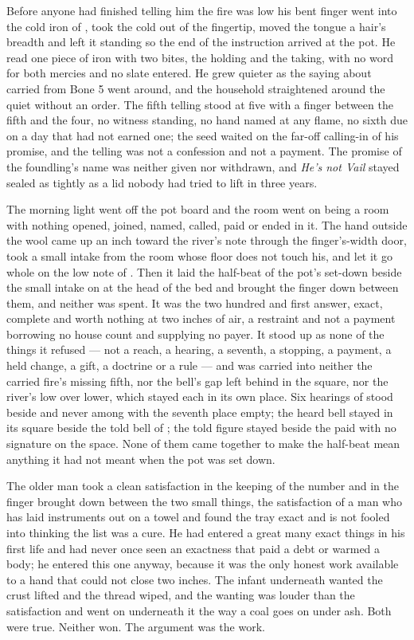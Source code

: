 Before anyone had finished telling him the fire was low his bent finger went into the cold iron of , took the cold out of the fingertip, moved the tongue a hair's breadth and left it standing so the end of the instruction arrived at the pot. He read one piece of iron with two bites, the holding and the taking, with no  word for both mercies and no slate entered. He grew quieter as the saying about  carried from Bone 5 went around, and the household straightened around the quiet without an order. The fifth telling stood at five with a finger between the fifth and the four, no witness standing, no hand named at any flame, no sixth due on a day that had not earned one; the seed waited on the far-off calling-in of his promise, and the telling was not a confession and not a payment. The promise of the foundling's name was neither given nor withdrawn, and \emph{He's not Vail} stayed sealed as tightly as a lid nobody had tried to lift in three years.

\scenebreak

The morning light went off the pot board and the room went on being a room with nothing opened, joined, named, called, paid or ended in it. The hand outside the wool came up an inch toward the river's note through the finger's-width door, took a small intake from the room whose floor does not touch his, and let it go whole on the low note of . Then it laid the half-beat of the pot's set-down beside the small intake on  at the head of the bed and brought the finger down between them, and neither was spent. It was the two hundred and first answer, exact, complete and worth nothing at two inches of air, a restraint and not a payment borrowing no house count and supplying no payer. It stood up as none of the things it refused --- not a reach, a hearing, a seventh, a stopping, a payment, a held change, a gift, a doctrine or a rule --- and was carried into neither the carried fire's missing fifth, nor the bell's gap left behind in the square, nor the river's low over lower, which stayed each in its own place. Six hearings of  stood beside and never among with the seventh place empty; the heard bell stayed in its square beside the told bell of ; the told figure stayed beside the paid with no signature on the space. None of them came together to make the half-beat mean anything it had not meant when the pot was set down.

The older man took a clean satisfaction in the keeping of the number and in the finger brought down between the two small things, the satisfaction of a man who has laid instruments out on a towel and found the tray exact and is not fooled into thinking the list was a cure. He had entered a great many exact things in his first life and had never once seen an exactness that paid a debt or warmed a body; he entered this one anyway, because it was the only honest work available to a hand that could not close two inches. The infant underneath wanted the crust lifted and the thread wiped, and the wanting was louder than the satisfaction and went on underneath it the way a coal goes on under ash. Both were true. Neither won. The argument was the work.

